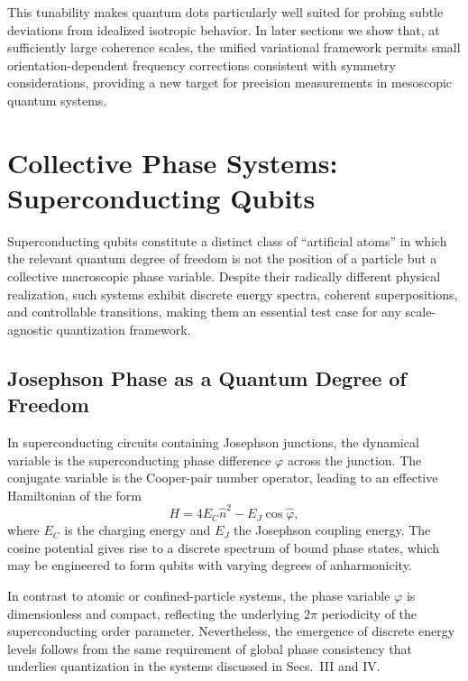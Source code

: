 \documentclass[11pt]{article}
\begin{document}
            This tunability makes quantum dots particularly well suited for probing subtle deviations from idealized isotropic behavior. In later sections we show that, at sufficiently large coherence scales, the unified variational framework permits small orientation-dependent frequency corrections consistent with symmetry considerations, providing a new target for precision measurements in mesoscopic quantum systems.

    \section{Collective Phase Systems: Superconducting Qubits}

        Superconducting qubits constitute a distinct class of ``artificial atoms'' in which the relevant quantum degree of freedom is not the position of a particle but a collective macroscopic phase variable. Despite their radically different physical realization, such systems exhibit discrete energy spectra, coherent superpositions, and controllable transitions, making them an essential test case for any scale-agnostic quantization framework.

        \subsection{Josephson Phase as a Quantum Degree of Freedom}

            In superconducting circuits containing Josephson junctions, the dynamical variable is the superconducting phase difference $\varphi$ across the junction. The conjugate variable is the Cooper-pair number operator, leading to an effective Hamiltonian of the form \cite{Josephson1962,Devoret2013}
            \begin{equation}
                H = 4E_C \hat{n}^2 - E_J \cos \hat{\varphi},
                \label{eq:josephson-hamiltonian}
            \end{equation}
            where $E_C$ is the charging energy and $E_J$ the Josephson coupling energy. The cosine potential gives rise to a discrete spectrum of bound phase states, which may be engineered to form qubits with varying degrees of anharmonicity.

            In contrast to atomic or confined-particle systems, the phase variable $\varphi$ is dimensionless and compact, reflecting the underlying $2\pi$ periodicity of the superconducting order parameter. Nevertheless, the emergence of discrete energy levels follows from the same requirement of global phase consistency that underlies quantization in the systems discussed in Secs.~III and IV.
\end{document}
